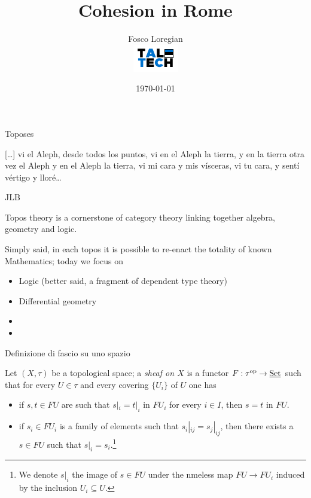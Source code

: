 \documentclass[presentation]{beamer}
\author{Fosco Loregian \\[3pt] \includegraphics[scale=1.5]{logo.pdf}}
\date{\today}
\title{Cohesion in Rome}
\begin{document}
\maketitle
\begin{frame}{Toposes}
	\linespread{.66}
	\epigraph{
		\tiny [\dots\unkern] vi el Aleph, desde todos los puntos, vi en el Aleph la tierra, y en la tierra otra vez el Aleph y en el Aleph la tierra, vi mi cara y mis vísceras, vi tu cara, y sentí vértigo y lloré\dots
	}{JLB}
	\linespread{1}
	Topos theory is a cornerstone of category theory linking together algebra, geometry and logic.

	Simply said, in each topos it is possible to re-enact the totality of known Mathematics; today we focus on
	\begin{itemize}
		\item<+-> Logic (better said, a fragment of \alert{dependent type theory})
		\item<+-> Differential geometry
		\item<+-> [Algebraic topology]
		\item<+-> [\dots]
	\end{itemize}
\end{frame}
%
%
%
%
%
%
%
\begin{frame}[label={sec:orgd0201f8}]{Definizione di fascio su uno spazio}
	\begin{block}{}
		Let $(X,\tau)$ be a topological space; a \emph{sheaf on $X$} is a functor $F : \tau^{\text{op}}\to \underline{\text{Set}}$ such that for every $U\in\tau$ and every covering $\{U_i\}$ of $U$ one has
		\begin{itemize}
			\item<+-> if $s, t\in FU$ are such that $s|_i = t|_i$ in $FU_i$ for every $i\in I$, then $s=t$ in $FU$.
			\item<+-> if $s_i\in FU_i$ is a family of elements such that $s_i|_{ij} = s_j|_{ij}$, then there exists a $s\in FU$ such that $s|_i = s_i$.\footnote{We denote $s|_i$ the image of $s\in FU$ under the nmeless map $FU\to FU_i$ induced by the inclusion $U_i\subseteq U$.}
		\end{itemize}
	\end{block}
\end{frame}
%
%
%
%
%
%
%
\end{document}
